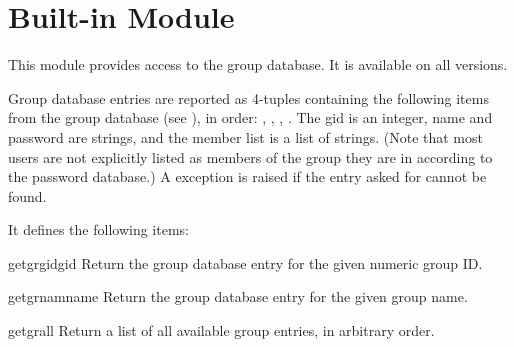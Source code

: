 \section{Built-in Module }
\label{module-grp}

This module provides access to the \UNIX{} group database.
It is available on all \UNIX{} versions.

Group database entries are reported as 4-tuples containing the
following items from the group database (see ), in order:
,
,
,
.
The gid is an integer, name and password are strings, and the member
list is a list of strings.
(Note that most users are not explicitly listed as members of the
group they are in according to the password database.)
A  exception is raised if the entry asked for cannot be found.

It defines the following items:

\renewcommand{\indexsubitem}{(in module grp)}
\begin{funcdesc}{getgrgid}{gid}
Return the group database entry for the given numeric group ID.
\end{funcdesc}

\begin{funcdesc}{getgrnam}{name}
Return the group database entry for the given group name.
\end{funcdesc}

\begin{funcdesc}{getgrall}{}
Return a list of all available group entries, in arbitrary order.
\end{funcdesc}
